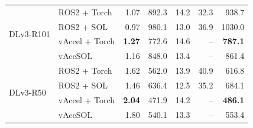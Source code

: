 \begin{table}[t]
\begin{tabular}{llrrrrr}
\cmidrule(lr){1-7}
\multirow{4}{*}{DLv3-R101} & ROS2 + Torch & 1.07 & 892.3 & 14.2 & 32.3 & 938.7 \\
 & ROS2 + SOL & 0.97 & 980.1 & 13.0 & 36.9 & 1030.0 \\
 & vAccel + Torch & \textbf{1.27} & 772.6 & 14.6 & -- & \textbf{787.1} \\
 & vAccSOL & 1.16 & 848.0 & 13.4 & -- & 861.4 \\
\cmidrule(lr){1-7}
\multirow{4}{*}{DLv3-R50} & ROS2 + Torch & 1.62 & 562.0 & 13.9 & 40.9 & 616.8 \\
 & ROS2 + SOL & 1.46 & 636.4 & 12.5 & 35.2 & 684.1 \\
 & vAccel + Torch & \textbf{2.04} & 471.9 & 14.2 & -- & \textbf{486.1} \\
 & vAccSOL & 1.80 & 540.1 & 13.3 & -- & 553.4 \\
\bottomrule
\end{tabular}
\end{table}


